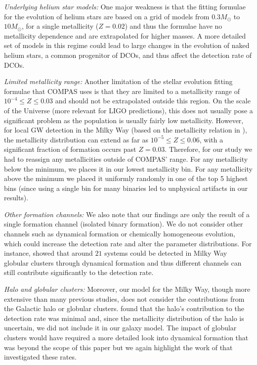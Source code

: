 \textit{Underlying helium star models:} One major weakness is that the \citet{Hurley+2000} fitting formulae for the evolution of helium stars are based on a grid of models from $0.3 \unit{M_{\odot}}$ to $10 \unit{M_{\odot}}$, for a single metallicity ($Z= 0.02$) and thus the formulae have no metallicity dependence and are extrapolated for higher masses. A more detailed set of models in this regime could lead to large changes in the evolution of naked helium stars, a common progenitor of DCOs, and thus affect the detection rate of DCOs.

\textit{Limited metallicity range:} Another limitation of the stellar evolution fitting formulae that COMPAS uses is that they are limited to a metallicity range of $10^{-4} \le Z \le 0.03$ and should not be extrapolated outside this region. On the scale of the Universe (more relevant for LIGO predictions), this does not usually pose a significant problem as the population is usually fairly low metallicity. However, for local GW detection in the Milky Way (based on the metallicity relation in \citet{Frankel+2018}), the metallicity distribution can extend as far as $10^{-5} \le Z \le 0.06$, with a significant fraction of formation occurs past $Z = 0.03$. Therefore, for our study we had to reassign any metallicities outside of COMPAS' range. For any metallicity below the minimum, we places it in our lowest metallicity bin. For any metallicity above the minimum we placed it uniformly randomly in one of the top 5 highest bins (since using a single bin for many binaries led to unphysical artifacts in our results).

\textit{Other formation channels:} We also note that our findings are only the result of a single formation channel (isolated binary formation). We do not consider other channels such as dynamical formation or chemically homogeneous evolution, which could increase the detection rate and alter the parameter distributions. For instance, \citet{Kremer+2018} showed that around $21$ systems could be detected in Milky Way globular clusters through dynamical formation and thus different channels can still contribute significantly to the detection rate.

\textit{Halo and globular clusters:} Moreover, our model for the Milky Way, though more extensive than many previous studies, does not consider the contributions from the Galactic halo or globular clusters. \citet{Lamberts+2018} found that the halo's contribution to the detection rate was minimal and, since the metallicity distribution of the halo is uncertain, we did not include it in our galaxy model. The impact of globular clusters would have required a more detailed look into dynamical formation that was beyond the scope of this paper but we again highlight the work of \citet{Kremer+2018} that investigated these rates.

